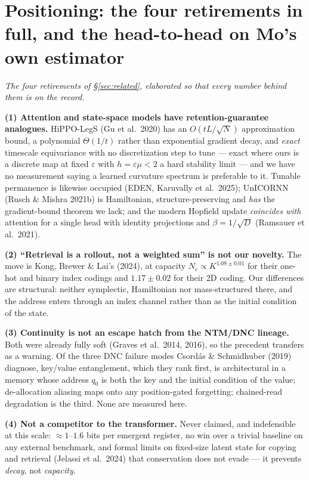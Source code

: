 \documentclass{article}
\begin{document}
\section{Positioning: the four retirements in full, and the head-to-head on Mo's own estimator}\label{app:pos}

\emph{The four retirements of \S\ref{sec:related}, elaborated so that every number behind them is on the record.}

\textbf{(1) Attention and state-space models have retention-guarantee analogues.} HiPPO-LegS (Gu et al.\ 2020) has an $O(tL/\sqrt N)$ approximation bound, a polynomial $\Theta(1/t)$ rather than exponential gradient decay, and \emph{exact} timescale equivariance with no discretization step to tune --- exact where ours is a discrete map at fixed $\varepsilon$ with $h=\varepsilon\mu<2$ a hard stability limit --- and we have no measurement saying a learned curvature spectrum is preferable to it. Tunable permanence is likewise occupied (EDEN, Karuvally et al.\ 2025); UnICORNN (Rusch \& Mishra 2021b) is Hamiltonian, structure-preserving and \emph{has} the gradient-bound theorem we lack; and the modern Hopfield update \emph{coincides with} attention for a single head with identity projections and $\beta=1/\sqrt D$ (Ramsauer et al.\ 2021).

\textbf{(2) ``Retrieval is a rollout, not a weighted sum'' is not our novelty.} The move is Kong, Brewer \& Lai's (2024), at capacity $N_c\propto K^{1.08\pm0.01}$ for their one-hot and binary index codings and $1.17\pm0.02$ for their 2D coding. Our differences are structural: neither symplectic, Hamiltonian nor mass-structured there, and the address enters through an index channel rather than as the initial condition of the state.

\textbf{(3) Continuity is not an escape hatch from the NTM/DNC lineage.} Both were already fully soft (Graves et al.\ 2014, 2016), so the precedent transfers as a warning. Of the three DNC failure modes Csord\'as \& Schmidhuber (2019) diagnose, key/value entanglement, which they rank first, is architectural in a memory whose address $q_0$ is both the key and the initial condition of the value; de-allocation aliasing maps onto any position-gated forgetting; chained-read degradation is the third. None are measured here.

\textbf{(4) Not a competitor to the transformer.} Never claimed, and indefensible at this scale: $\approx1$--$1.6$ bits per emergent register, no win over a trivial baseline on any external benchmark, and formal limits on fixed-size latent state for copying and retrieval (Jelassi et al.\ 2024) that conservation does not evade --- it prevents \emph{decay}, not \emph{capacity}.
\end{document}
